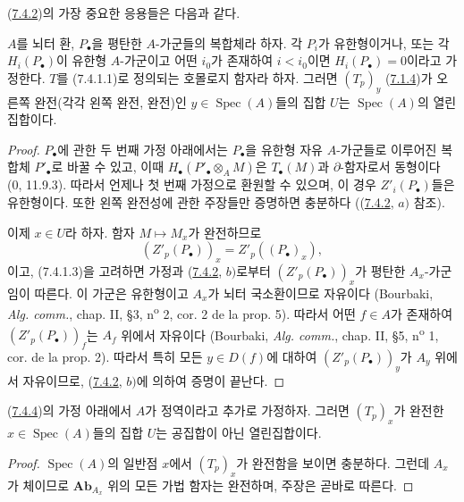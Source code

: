 (\hyperref[III.7.4.2-fr]{7.4.2})의 가장 중요한 응용들은 다음과 같다.

\begin{proposition}[7.4.4]
\label{III.7.4.4-fr}
$A$를 뇌터 환, $P_\bullet$을 평탄한 $A$-가군들의 복합체라 하자.
각 $P_i$가 유한형이거나, 또는 각 $H_i(P_\bullet)$이 유한형
$A$-가군이고 어떤 $i_0$가 존재하여 $i<i_0$이면
$H_i(P_\bullet)=0$이라고 가정한다. $T$를 (7.4.1.1)로 정의되는
호몰로지 함자라 하자. 그러면 $(T_p)_y$
(\hyperref[III.7.1.4-fr]{7.1.4})가 오른쪽 완전(각각 왼쪽 완전,
완전)인 $y\in\operatorname{Spec}(A)$들의 집합 $U$는
$\operatorname{Spec}(A)$의 열린집합이다.
\end{proposition}

\begin{proof}
$P_\bullet$에 관한 두 번째 가정 아래에서는 $P_\bullet$을 유한형 자유
$A$-가군들로 이루어진 복합체 $P'_\bullet$로 바꿀 수 있고, 이때
$H_\bullet(P'_\bullet\otimes_A M)$은 $T_\bullet(M)$과
$\partial$-함자로서 동형이다 (0, 11.9.3). 따라서 언제나 첫 번째
가정으로 환원할 수 있으며, 이 경우 $Z'_i(P_\bullet)$들은 유한형이다.
또한 왼쪽 완전성에 관한 주장들만 증명하면 충분하다
((\hyperref[III.7.4.2-fr]{7.4.2}, $a)$ 참조).

이제 $x\in U$라 하자. 함자 $M\mapsto M_x$가 완전하므로
\[
  (Z'_p(P_\bullet))_x=Z'_p((P_\bullet)_x),
\]
이고, (7.4.1.3)을 고려하면 가정과
(\hyperref[III.7.4.2-fr]{7.4.2}, $b)$로부터
$(Z'_p(P_\bullet))_x$가 평탄한 $A_x$-가군임이 따른다. 이 가군은
유한형이고 $A_x$가 뇌터 국소환이므로 자유이다 (Bourbaki,
\emph{Alg. comm.}, chap. II, \S 3, n\textsuperscript{o} 2, cor. 2
de la prop. 5). 따라서 어떤 $f\in A$가 존재하여
$(Z'_p(P_\bullet))_f$는 $A_f$ 위에서 자유이다 (Bourbaki,
\emph{Alg. comm.}, chap. II, \S 5, n\textsuperscript{o} 1,
cor. de la prop. 2). 따라서 특히 모든 $y\in D(f)$에 대하여
$(Z'_p(P_\bullet))_y$가 $A_y$
위에서 자유이므로, (\hyperref[III.7.4.2-fr]{7.4.2}, $b)$에 의하여
증명이 끝난다.
\end{proof}

\begin{corollary}[7.4.5]
\label{III.7.4.5-fr}
(\hyperref[III.7.4.4-fr]{7.4.4})의 가정 아래에서 $A$가 정역이라고
추가로 가정하자. 그러면 $(T_p)_x$가 완전한
$x\in\operatorname{Spec}(A)$들의 집합 $U$는 공집합이 아닌
열린집합이다.
\end{corollary}

\begin{proof}
$\operatorname{Spec}(A)$의 일반점 $x$에서 $(T_p)_x$가 완전함을
보이면 충분하다. 그런데 $A_x$가 체이므로
$\mathbf{Ab}_{A_x}$ 위의 모든 가법 함자는 완전하며, 주장은 곧바로
따른다.
\end{proof}

